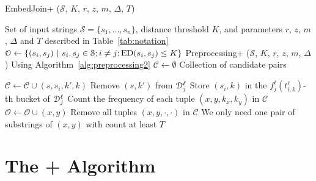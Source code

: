 \begin{algorithm}[]
\caption{EmbedJoin+ ($\mathcal{S}$, $K$, $r$, $z$, $m$, $\Delta$, $T$)}
\label{alg:embed-joins+}
\begin{algorithmic}[1]
\Require Set of input strings $\mathcal{S} = \{s_1, \ldots, s_n\}$, distance threshold $K$, and parameters $r$, $z$, $m$, $\Delta$ and $T$ described in Table~\ref{tab:notation}
\Ensure  $\mathcal{O} \gets \{(s_i, s_j)\ |\ s_i, s_j \in \mathcal{S}; i \neq j; \text{ED}(s_i, s_j) \le K\}$ 
\State Preprocessing+ ($\mathcal{S}$, $K$, $r$, $z$, $m$, $\Delta$) 
\Comment Using Algorithm~\ref{alg:preprocessing2}
\State  $\mathcal{C} \leftarrow \emptyset $  
\Comment Collection of candidate pairs

	\ForEach{$\ell \in [r]$}
				 \label{ln:a-1}
				\State $\mathcal{C}  \leftarrow \mathcal{C}  \cup (s, s_i, k', k)$ \label{line:d-1}
\Else
				\State Remove $(s,k')$ from $\mathcal{D}_j^\ell$ \label{ln:a-2}
				\EndIf
			\EndFor
			\State Store $(s_{i},k)$ in the $f_j^\ell (t_{i,k}^\ell)$-th bucket of $\mathcal{D}_j^\ell$ \label{line:d-2}
		\EndFor
		\EndFor
	\EndFor
\EndFor
\State Count the frequency of each tuple $(x, y,k_x,k_y)$ in  $\mathcal{C}$
	\State $\mathcal{O} \leftarrow  \mathcal{O} \cup (x, y)$
	\EndIf
\State Remove all tuples $(x, y, \cdot, \cdot)$ in $\mathcal{C}$ \label{line:d-4}
\Comment We only need one pair of substrings of $(x, y)$ with count at least $T$
\EndFor
\end{algorithmic}
\end{algorithm}
\section{The \ebdjoin+ Algorithm}
\label{sec:improved}



